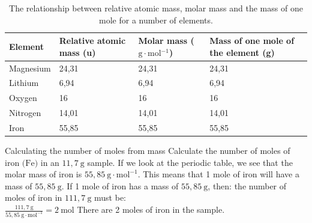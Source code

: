           \begin{table}[H]
        \begin{center}
      \label{m38717*uid11}
    \noindent
      \begin{tabular}{|l|l|l|p{3cm}|}\hline
                \textbf{Element}
               &
                \textbf{Relative atomic mass (u)}
               &
                \textbf{Molar mass ($\text{g}\ensuremath{\cdot}\text{mol}{}^{-1}$)}
               &
                \textbf{Mass of one mole of the element (g)} \\ \hline
        Magnesium &
        24,31 &
        24,31 &
        24,31 \\ \hline
        Lithium &
        6,94 &
        6,94 &
        6,94 \\ \hline
        Oxygen &
        16 &
        16 &
        16 \\ \hline
        Nitrogen &
        14,01 &
        14,01 &
        14,01  \\ \hline
        Iron &
        55,85 &
        55,85 &
        55,85 \\ \hline
    \end{tabular}
      \end{center}
    \caption{The relationship between relative atomic mass, molar mass and the mass of one mole for a number of elements.}
\end{table}

      \begin{wex}{Calculating the number of moles from mass }{
      \label{m38717*id276776}Calculate the number of moles of iron $\text{(Fe)}$ in an $11,7 ~\text{g}$ sample.  }
{
      \label{m38717*id276821}If we look at the periodic table, we see that the molar mass of iron is $55,85 ~\text{g} \cdot \text{mol}^{-1}$. This means that 1 mole of iron will have a mass of $55,85 ~\text{g}$.
      \label{m38717*id276848}If 1 mole of iron has a mass of $55,85 ~\text{g}$, then: the number of moles of iron in $111,7 ~\text{g}$ must be: \\
$\frac{111,7 ~\text{g}}{55,85 ~\text{g} \cdot{\text{mol}}^{-1}}=2 ~\text{mol}$
      \label{m38717*id276911}There are 2 moles of iron in the sample. 
}
    \end{wex}

